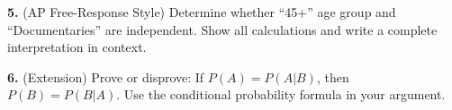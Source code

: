 \documentclass[10pt]{article}
\begin{document}
\begin{practicebox}
\vspace{8pt}
\textbf{5.} (AP Free-Response Style) Determine whether ``45+'' age group and
``Documentaries'' are independent. Show all calculations and write a complete
interpretation in context.\\

\vspace{8pt}
\textbf{6.} (Extension) Prove or disprove: If $P(A) = P(A|B)$, then
$P(B) = P(B|A)$. Use the conditional probability formula in your argument.\\
\writeline\\[1pt]\writeline\\[1pt]\writeline
\end{practicebox}
\end{document}
